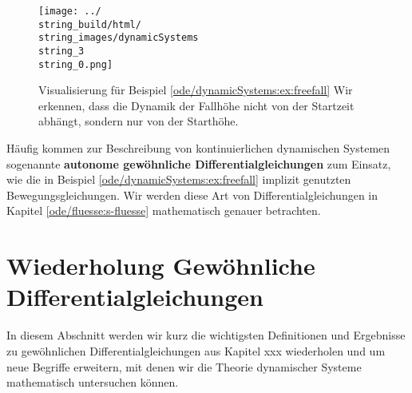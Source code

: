 \begin{figure}[htbp]
\centering


\noindent\texttt{[image: ../\\string\_build/html/\\string\_images/dynamicSystems\\string\_3\\string\_0.png]}
\caption{Visualisierung für Beispiel \cref{ode/dynamicSystems:ex:freefall}  Wir erkennen, dass die Dynamik der Fallhöhe nicht von der Startzeit abhängt, sondern nur von der Starthöhe.}\label{\detokenize{ode/dynamicSystems:fig-free-fall}}\end{figure}

Häufig kommen zur Beschreibung von kontinuierlichen dynamischen Systemen sogenannte \textbf{autonome gewöhnliche Differentialgleichungen} zum Einsatz, wie die in Beispiel \cref{ode/dynamicSystems:ex:freefall} implizit genutzten Bewegungsgleichungen.
Wir werden diese Art von Differentialgleichungen in Kapitel \cref{ode/fluesse:s-fluesse}  mathematisch genauer betrachten.


\section{Wiederholung Gewöhnliche Differentialgleichungen}
\label{\detokenize{ode/repetition:wiederholung-gewohnliche-differentialgleichungen}}\label{\detokenize{ode/repetition::doc}}
In diesem Abschnitt werden wir kurz die wichtigsten Definitionen und Ergebnisse zu gewöhnlichen Differentialgleichungen aus Kapitel xxx \cite{Ten21} wiederholen und um neue Begriffe erweitern, mit denen wir die Theorie dynamischer Systeme mathematisch untersuchen können.



